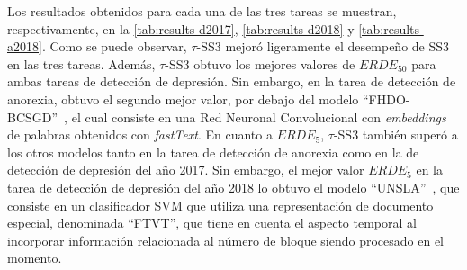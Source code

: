 \begin{figure}[t!]
\label{fig:subject9579_descriptive_ts33}
\end{figure}

Los resultados obtenidos para cada una de las tres tareas se muestran, respectivamente, en la \autoref{tab:results-d2017}, \autoref{tab:results-d2018} y \autoref{tab:results-a2018}.
Como se puede observar, $\tau$-SS3 mejoró ligeramente el desempeño de SS3 en las tres tareas.
Además, $\tau$-SS3 obtuvo los mejores valores de $ERDE_{50}$ para ambas tareas de detección de depresión. Sin embargo, en la tarea de detección de anorexia, obtuvo el segundo mejor valor, por debajo del modelo ``FHDO-BCSGD''~\cite{trotzek2018word}, el cual consiste en una Red Neuronal Convolucional con \emph{embeddings} de palabras obtenidos con \emph{fastText}.
En cuanto a $ERDE_{5}$, $\tau$-SS3 también superó a los otros modelos tanto en la tarea de detección de anorexia como en la de detección de depresión del año 2017.
Sin embargo, el mejor valor $ERDE_{5}$ en la tarea de detección de depresión del año 2018 lo obtuvo el modelo ``UNSLA''~\cite{funez2018}, que consiste en un clasificador \ac{SVM} que utiliza una representación de documento especial, denominada ``FTVT'', que tiene en cuenta el aspecto temporal al incorporar información relacionada al número de bloque siendo procesado en el momento.
